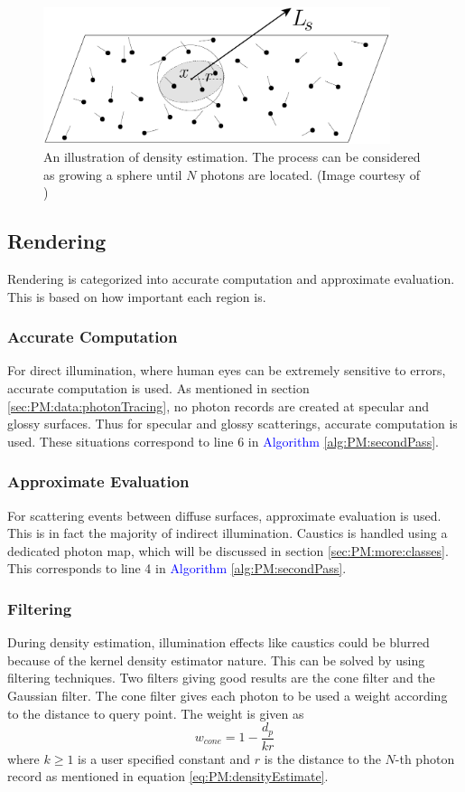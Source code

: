 \documentclass[]{book}
\begin{document}
\begin{figure}[t]
	\centering
	\includegraphics[width=4.0in]{img/PM-density.PNG}
	\caption[Density Estimation]{An illustration of density estimation. The process can be considered as growing a sphere until $N$ photons are located. (Image courtesy of \citeauthor{jensen1996global})}
	\label{fig:PM:densityEstimate}
\end{figure}

\subsection{Rendering}
\label{sec:PM:render:render}
Rendering is categorized into accurate computation and approximate evaluation.
This is based on how important each region is.

\subsubsection*{Accurate Computation}
For direct illumination, where human eyes can be extremely sensitive to errors, accurate computation is used.
As mentioned in section \ref{sec:PM:data:photonTracing}, no photon records are created at specular and glossy surfaces.
Thus for specular and glossy scatterings, accurate computation is used.
These situations correspond to line 6 in \textcolor{blue}{Algorithm \ref{alg:PM:secondPass}}.

\subsubsection*{Approximate Evaluation}
For scattering events between diffuse surfaces, approximate evaluation is used.
This is in fact the majority of indirect illumination.
Caustics is handled using a dedicated photon map, which will be discussed in section \ref{sec:PM:more:classes}.
This corresponds to line 4 in \textcolor{blue}{Algorithm \ref{alg:PM:secondPass}}.

\subsubsection*{Filtering}
During density estimation, illumination effects like caustics could be blurred because of the kernel density estimator nature.
This can be solved by using filtering techniques.
Two filters giving good results are the cone filter and the Gaussian filter.
The cone filter gives each photon to be used a weight according to the distance to query point.
The weight is given as
\begin{equation*}
	w_{cone} = 1- \frac{d_p}{kr}
\end{equation*}
where $k\geq 1$ is a user specified constant and $r$ is the distance to the $N$-th photon record as mentioned in equation \ref{eq:PM:densityEstimate}.
\end{document}

